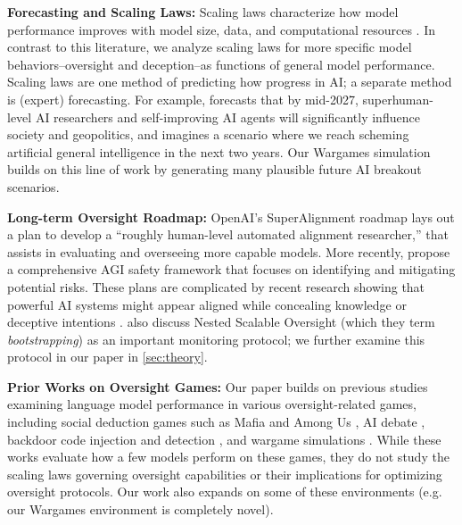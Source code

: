 \documentclass{article}
\begin{document}
\textbf{Forecasting and Scaling Laws:} Scaling laws characterize how model performance improves with model size, data, and computational resources \citep{kaplan2020scaling,aghajanyan2023scaling,cherti2023reproducible,alabdulmohsin2022revisiting}. In contrast to this literature, we analyze scaling laws for more specific model behaviors--oversight and deception--as functions of general model performance. Scaling laws are one method of predicting how  progress in AI; a separate method is (expert) forecasting. For example, \cite{AI2027} forecasts that by mid-2027, superhuman-level AI researchers and self-improving AI agents will significantly influence society and geopolitics, and \cite{clymer2025takeover} imagines a scenario where we reach scheming artificial general intelligence in the next two years. Our Wargames simulation builds on this line of work by generating many plausible future AI breakout scenarios. %

\textbf{Long-term Oversight Roadmap:} 
OpenAI's SuperAlignment roadmap \citep{openai_superalignment_2023} lays out a plan to develop a ``roughly human-level automated alignment researcher,'' that assists in evaluating and overseeing more capable models. More recently, \cite{shah2025approach} propose a comprehensive AGI safety framework that focuses on identifying and mitigating potential risks.
These plans are complicated by recent research showing that powerful AI systems might appear aligned while concealing knowledge or deceptive intentions \citep{greenblatt2024alignment,christiano2018supervising}. \cite{shah2025approach} also discuss Nested Scalable Oversight (which they term \textit{bootstrapping}) as an important monitoring protocol; we further examine this protocol in our paper in \cref{sec:theory}.





\textbf{Prior Works on Oversight Games:} Our paper builds on previous studies examining language model performance in various oversight-related games, including social deduction games such as Mafia \citep{yoo2024finding, guzus2025llm} and Among Us \citep{golechha2025among}, AI debate \citep{kenton2024scalable}, backdoor code injection and detection \citep{greenblatt2023ai}, and wargame simulations \citep{hogan2024open}. While these works evaluate how a few  models perform on these games, they do not study the scaling laws governing oversight capabilities or their implications for optimizing oversight protocols. Our work also expands on some of these environments (e.g. our Wargames environment is completely novel).
\end{document}
